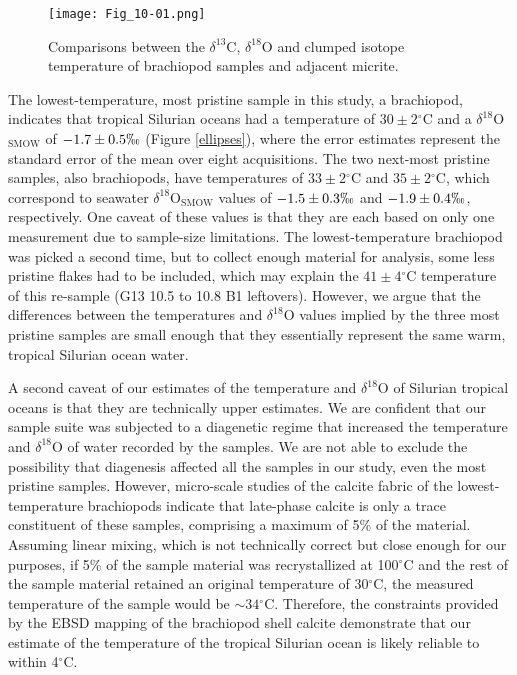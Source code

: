\documentclass[5p, authoryear]{elsarticle}
\newcommand{\deltao}{$\delta^{18}$}
\newcommand{\deltac}{$\delta^{13}$}
\newcommand{\degrees}{$^{\circ}$}
\begin{document}
\begin{figure}[h]
\centering
\texttt{[image: Fig\_10-01.png]}
\caption{Comparisons between the \deltac C, \deltao O and clumped isotope temperature of brachiopod samples and adjacent micrite.}
\label{comparisons}
\end{figure}

The lowest-temperature, most pristine sample in this study, a brachiopod, indicates that tropical Silurian oceans had a temperature of $30\pm 2$\degrees C and a \deltao O$_{\text{SMOW}}$ of $-1.7\pm 0.5\permil$ (Figure \ref{ellipses}), where the error estimates represent the standard error of the mean over eight acquisitions. The two next-most pristine samples, also brachiopods, have temperatures of $33\pm 2$\degrees C and $35\pm 2$\degrees C, which correspond to seawater \deltao O$_{\text{SMOW}}$ values of $-1.5\pm 0.3\permil$ and $-1.9\pm 0.4\permil$, respectively. One caveat of these values is that they are each based on only one measurement due to sample-size limitations. The lowest-temperature brachiopod was picked a second time, but to collect enough material for analysis, some less pristine flakes had to be included, which may explain the $41\pm 4$\degrees C temperature of this re-sample (G13 10.5 to 10.8 B1 leftovers). However, we argue that the differences between the temperatures and \deltao O values implied by the three most pristine samples are small enough that they essentially represent the same warm, tropical Silurian ocean water. 

A second caveat of our estimates of the temperature and \deltao O of Silurian tropical oceans is that they are technically upper estimates. We are confident that our sample suite was subjected to a diagenetic regime that increased the temperature and \deltao O of water recorded by the samples. We are not able to exclude the possibility that diagenesis affected all the samples in our study, even the most pristine samples. However, micro-scale studies of the calcite fabric of the lowest-temperature brachiopods indicate that late-phase calcite is only a trace constituent of these samples, comprising a maximum of 5\% of the material. Assuming linear mixing, which is not technically correct but close enough for our purposes, if 5\% of the sample material was recrystallized at 100\degrees C and the rest of the sample material retained an original temperature of 30\degrees C, the measured temperature of the sample would be $\sim34$\degrees C. Therefore, the constraints provided by the EBSD mapping of the brachiopod shell calcite demonstrate that our estimate of the temperature of the tropical Silurian ocean is likely reliable to within 4\degrees C. 
\end{document}
